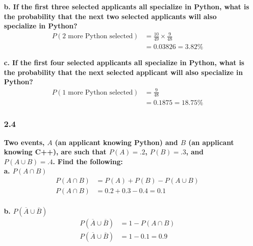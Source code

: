 \documentclass[
	a4paper, %
	10pt, %
	unnumberedsections, %
	twoside, %
]{LTJournalArticle}
\begin{document}
\textbf{b. If the first three selected applicants all specialize in Python, what is the probability that the next two selected applicants will also specialize in Python?} \\
\begin{equation*}
    \begin{aligned}
        P(\text{2 more Python selected}) &= \frac{10}{49} \times \frac{9}{48} \\
        &= 0.03826 = 3.82\%
    \end{aligned}
\end{equation*}
\vspace{2pt}

\textbf{c. If the first four selected applicants all specialize in Python, what is the probability that the next selected applicant will also specialize in Python?} \\
\begin{equation*}
    \begin{aligned}
        P(\text{1 more Python selected}) &= \frac{9}{48} \\ 
        & = 0.1875 = 18.75\%
    \end{aligned}
\end{equation*}
\vspace*{1pt}\noindent
\subsubsection{2.4}
\textbf{Two events, $A$ (an applicant knowing Python) and $B$ (an applicant knowing C++), are such that $P(A) = .2$, $P(B) = .3$, and $P(A \cup B) = .4$. Find the following:} \\

\textbf{a. $P(A \cap B)$}
\begin{equation*}
    \begin{aligned}
        P(A \cap B) &= P(A) + P(B) - P(A \cup B) \\
        P(A \cap B) &= 0.2 + 0.3 - 0.4 = 0.1 \\
    \end{aligned}
\end{equation*}

\textbf{b. $P(\overline A \cup \overline B)$} \\
\begin{equation*}
    \begin{aligned}
        P(\overline A \cup \overline B) &= 1 - P(A \cap B) \\
        P(\overline A \cup \overline B) &= 1 - 0.1 = 0.9 \\
    \end{aligned}
\end{equation*}
\end{document}

